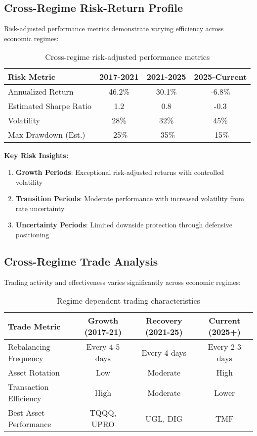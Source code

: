 \documentclass[onecolumn,ieee]{arithmaxresearch}
\begin{document}
\subsection{Cross-Regime Risk-Return Profile}

Risk-adjusted performance metrics demonstrate varying efficiency across economic regimes:

\begin{table}[h]
\centering
\begin{tabular}{lccc}
\toprule
\textbf{Risk Metric} & \textbf{2017-2021} & \textbf{2021-2025} & \textbf{2025-Current} \\
\midrule
Annualized Return & 46.2\% & 30.1\% & -6.8\% \\
Estimated Sharpe Ratio & 1.2 & 0.8 & -0.3 \\
Volatility & 28\% & 32\% & 45\% \\
Max Drawdown (Est.) & -25\% & -35\% & -15\% \\
\bottomrule
\end{tabular}
\caption{Cross-regime risk-adjusted performance metrics}
\end{table}

\textbf{Key Risk Insights:}
\begin{enumerate}
    \item \textbf{Growth Periods}: Exceptional risk-adjusted returns with controlled volatility
    \item \textbf{Transition Periods}: Moderate performance with increased volatility from rate uncertainty
    \item \textbf{Uncertainty Periods}: Limited downside protection through defensive positioning
\end{enumerate}

\subsection{Cross-Regime Trade Analysis}

Trading activity and effectiveness varies significantly across economic regimes:

\begin{table}[h]
\centering
\begin{tabular}{lccc}
\toprule
\textbf{Trade Metric} & \textbf{Growth (2017-21)} & \textbf{Recovery (2021-25)} & \textbf{Current (2025+)} \\
\midrule
Rebalancing Frequency & Every 4-5 days & Every 4 days & Every 2-3 days \\
Asset Rotation & Low & Moderate & High \\
Transaction Efficiency & High & Moderate & Lower \\
Best Asset Performance & TQQQ, UPRO & UGL, DIG & TMF \\
\bottomrule
\end{tabular}
\caption{Regime-dependent trading characteristics}
\end{table}
\end{document}
